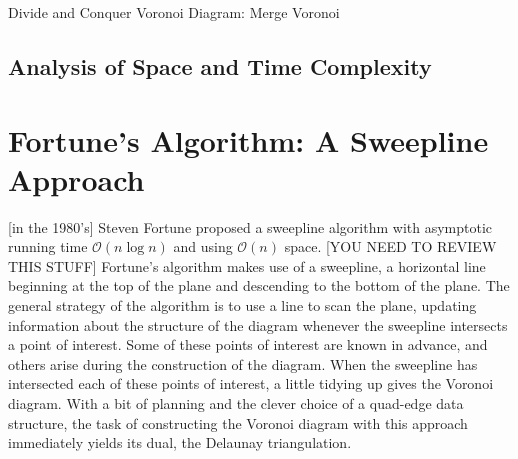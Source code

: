 \documentclass[12pt,twoside]{reedthesis}
\makeatletter
\let\OldStatex\Statex
\renewcommand{\Statex}[1][3]{%
  \setlength\@tempdima{\algorithmicindent}%
  \OldStatex\hskip\dimexpr#1\@tempdima\relax}
\makeatother
\begin{document}
  \begin{algorithm}[H]
  \end{algorithm}

  \begin{algorithm}[H]
  \begin{algorithmic}[1]
  \caption{Divide and Conquer Voronoi Diagram: Merge Voronoi}\label{HandleCircleEvent}
  \EndProcedure
  \end{algorithmic} 
  \end{algorithm}
  
  
  \subsection{Analysis of Space and Time Complexity} %
  \label{sub:analysis_of_space_and_time_complexity}
  


  \section{Fortune's Algorithm: A Sweepline Approach} %
  \label{sec:fortune_s_algorithm}
  [in the 1980's] Steven Fortune proposed a sweepline algorithm with asymptotic running time $\mathcal{O}(n\log n)$ and using $\mathcal{O}(n)$ space. [YOU NEED TO REVIEW THIS STUFF] Fortune's algorithm makes use of a sweepline, a horizontal line beginning at the top of the plane and descending to the bottom of the plane. The general strategy of the algorithm is to use a line to scan the plane, updating information about the structure of the diagram whenever the sweepline intersects a point of interest. Some of these points of interest are known in advance, and others arise during the construction of the diagram. When the sweepline has intersected each of these points of interest, a little tidying up gives the Voronoi diagram. With a bit of planning and the clever choice of a quad-edge data structure, the task of constructing the Voronoi diagram with this approach immediately yields its dual, the Delaunay triangulation.
\end{document}
